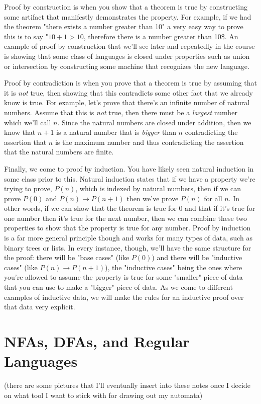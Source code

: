 \documentclass[11pt]{article}
\begin{document}
Proof by construction is when you show that a theorem is true by constructing some artifact that manifestly demonstrates the property. For example, if we had the theorem "there exists a number greater than 10" a very easy way to prove this is to say "$10+1 > 10$, therefore there is a number greater than 10\$. An example of proof by construction that we'll see later and repeatedly in the course is showing that some class of languages is closed under properties such as union or intersection by constructing some machine that recognizes the new language.

Proof by contradiction is when you prove that a theorem is true by assuming that it is \emph{not} true, then showing that this contradicts some other fact that we already know is true. For example, let's prove that there's an infinite number of natural numbers. Assume that this is \emph{not} true, then there must be a \emph{largest} number which we'll call $n$. Since the natural numbers are closed under addition, then we know that $n+1$ is a natural number that is \emph{bigger} than $n$ contradicting the assertion that $n$ is the maximum number and thus contradicting the assertion that the natural numbers are finite.

Finally, we come to proof by induction. You have likely seen natural induction in some class prior to this. Natural induction states that if we have a property we're trying to prove, $P(n)$, which is indexed by natural numbers, then if we can prove $P(0)$ and $P(n) \to P(n+1)$ then we've prove $P(n)$ for all $n$. In other words, if we can show that the theorem is true for 0 and that if it's true for one number then it's true for the next number, then we can combine these two properties to show that the property is true for any number. Proof by induction is a far more general principle though and works for many types of data, such as binary trees or lists. In every instance, though, we'll have the same structure for the proof: there will be "base cases" (like $P(0)$) and there will be "inductive cases" (like $P(n) \to P(n+1)$), the "inductive cases" being the ones where you're allowed to assume the property is true for some "smaller" piece of data that you can use to make a "bigger" piece of data. As we come to different examples of inductive data, we will make the rules for an inductive proof over that data very explicit.
\section{NFAs, DFAs, and Regular Languages}
\label{sec-2}
(there are some pictures that I'll eventually insert into these notes once I decide on what tool I want to stick with for drawing out my automata)
\end{document}
